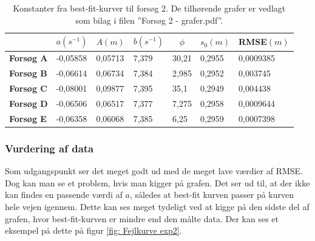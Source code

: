 \begin{table}[h]
\centering
\begin{tabular}{|l|l|l|l|l|l|l|}
\hline
\multicolumn{1}{|c|}{} & \multicolumn{1}{c|}{\textbf{$a(s^{-1})$}} & \multicolumn{1}{c|}{\textbf{$A(m)$}} & \multicolumn{1}{c|}{\textbf{$b(s^{-1})$}} & \multicolumn{1}{c|}{\textbf{$\phi$}} & \multicolumn{1}{c|}{\textbf{$s_0(m)$}} & \multicolumn{1}{c|}{\textbf{RMSE$(m)$}} \\ \hline
\textbf{Forsøg A}      & -0,05858                          & 0,05713                           & 7,379                             & 30,21                                & 0,2955                              & 0,0009385                          \\ \hline
\textbf{Forsøg B}      & -0,06614                          & 0,06734                           & 7,384                             & 2,985                                & 0,2952                              & 0,003745                           \\ \hline
\textbf{Forsøg C}      & -0,08001                          & 0,09877                           & 7,395                             & 35,1                                 & 0,2949                              & 0,004438                           \\ \hline
\textbf{Forsøg D}      & -0,06506                          & 0,06517                           & 7,377                             & 7,275                                & 0,2958                              & 0,0009644                          \\ \hline
\textbf{Forsøg E}      & -0,06358                          & 0,06068                           & 7,385                             & 6,25                                 & 0,2959                              & 0,0007398                          \\ \hline
\end{tabular}
\caption{Konstanter fra best-fit-kurver til forsøg 2. De tilhørende grafer er vedlagt som bilag i filen ''Forsøg 2 - grafer.pdf''.}
\label{tabel: best fit exp2}
\end{table}

\subsubsection{Vurdering af data}

Som udgangspunkt ser det meget godt ud med de meget lave værdier af RMSE. 
Dog kan man se et problem, hvis man kigger på grafen.
Det ser ud til, at der ikke kan findes en passende værdi af $a$, således at best-fit kurven passer på kurven hele vejen igennem. 
Dette kan ses meget tydeligt ved at kigge på den sidste del af grafen, hvor best-fit-kurven er mindre end den målte data.
Der kan ses et eksempel på dette på figur \ref{fig: Fejlkurve exp2}.

